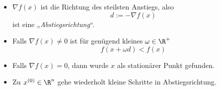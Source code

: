 \documentclass[11pt]{scrartcl}
\begin{document}
\begin{seg}
	\begin{itemize}
		\item
			$\nabla f(x)$ ist die Richtung des steilsten Anstiegs, also
			\[
				d := -\nabla f(x)
			\]
			ist eine „\emph{Abstiegsrichtung}“.
		\item
			Falls $\nabla f(x) \neq 0$ ist für genügend kleines $\omega \in \R^+$
			\[
				f(x + \omega d) < f(x)
			\]
		\item
			Falls $\nabla f(x) = 0$, dann wurde $x$ als stationärer Punkt gefunden.
		\item
			Zu $x^{(0)} \in \R^n$ gehe wiederholt kleine Schritte in Abstiegsrichtung.
	\end{itemize}
\end{seg}
\end{document}
